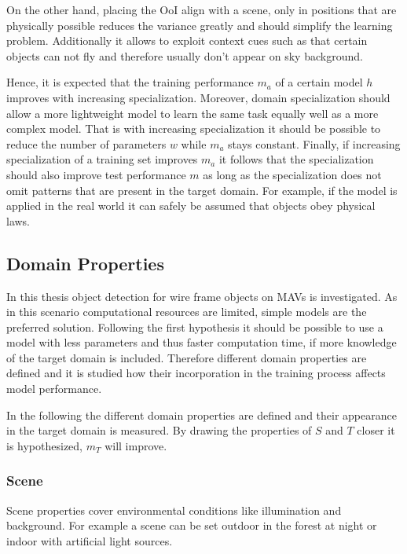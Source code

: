 On the other hand, placing the \ac{OoI} align with a scene, only in positions that are physically possible reduces the variance greatly and should simplify the learning problem. Additionally it allows to exploit context cues such as that certain objects can not fly and therefore usually don't appear on sky background.

Hence, it is expected that the training performance $m_{a}$ of a certain model $h$ improves with increasing specialization. Moreover, domain specialization should allow a more lightweight model to learn the same task equally well as a more complex model. That is with increasing specialization it should be possible to reduce the number of parameters $w$ while $m_{a}$ stays constant. Finally, if increasing specialization of a training set improves $m_{a}$ it follows that the specialization should also improve test performance $m$ as long as the specialization does not omit patterns that are present in the target domain. For example, if the model is applied in the real world it can safely be assumed that objects obey physical laws.

\subsection{Domain Properties}

In this thesis object detection for wire frame objects on \acp{MAV} is investigated. As in this scenario computational resources are limited, simple models are the preferred solution. Following the first hypothesis it should be possible to use a model with less parameters and thus faster computation time, if more knowledge of the target domain is included. Therefore different domain properties are defined and it is studied how their incorporation in the training process affects model performance.

In the following the different domain properties are defined and their appearance in the target domain is measured. By drawing the properties of $S$ and $T$ closer it is hypothesized, $m_T$ will improve.

\subsubsection{Scene}

Scene properties cover environmental conditions like illumination and background. For example a scene can be set outdoor in the forest at night or indoor with artificial light sources.

